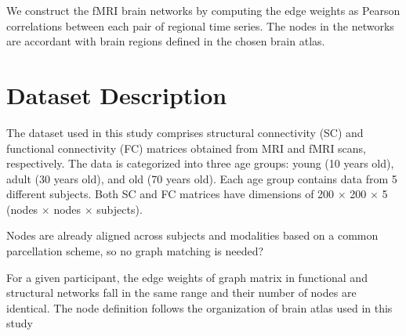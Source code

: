 We construct the fMRI brain networks by computing the edge weights
as Pearson correlations between each pair of regional time
series. The nodes in the networks are accordant with brain
regions defined in the chosen brain atlas. \cite{Zhang2022}

\section{Dataset Description}
The dataset used in this study comprises structural connectivity (SC) and functional connectivity (FC) matrices 
obtained from MRI and fMRI scans, respectively. The data is categorized into three age groups: 
young (10 years old), adult (30 years old), and old (70 years old). Each age group contains data from 5 different subjects.
Both SC and FC matrices have dimensions of 200 $\times$ 200 $\times$ 5 (nodes $\times$ nodes $\times$ subjects).

Nodes are already aligned across subjects and modalities based on a 
common parcellation scheme, so no graph matching is needed? \cite{Puxeddu2022}

For a given participant, the edge weights of graph matrix
in functional and structural networks fall in the same range
and their number of nodes are identical. The node definition
follows the organization of brain atlas used in this study
\cite{Zhang2022}


